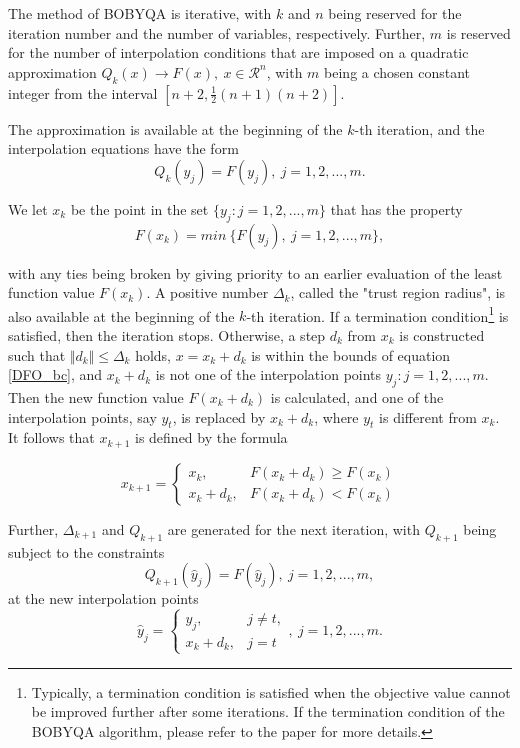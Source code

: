 \documentclass  [
  paper    = a4,
  BCOR     = 10mm,
  twoside,
  fontsize = 12pt,
  fleqn,
  toc      = bibnumbered,
  toc      = listofnumbered,
  numbers  = noendperiod,
  headings = normal,
  listof   = leveldown,
  version  = 3.03
]                                       {scrreprt}
\newcommand{\<}{\langle}
\renewcommand{\>}{\rangle}
\begin{document}
The method of BOBYQA is iterative, with $k$ and $n$ being reserved for the iteration number and the number of variables, respectively. Further, $m$ is reserved for the number of interpolation conditions that are imposed on a quadratic approximation $Q_k(x) \xrightarrow{} F(x), \ x \in  \mathcal{R}^n$, with $m$ being a chosen constant integer from the interval $[n+2, \frac{1}{2}(n+1)(n+2)]$. 

The approximation is available at the beginning of the $k$-th iteration, and the interpolation equations have the form
\begin{equation}
	Q_k(y_j)= F(y_j),\   j = 1, 2, ..., m.
\end{equation}

We let $x_k$ be the point in the set $\{y_j : j = 1, 2, ... , m\}$ that has the property
\begin{equation}
	F(x_k)= min\ \{F(y_j), \  j = 1, 2, ..., m\}, 
\end{equation}

with any ties being broken by giving priority to an earlier evaluation of the least function value $F(x_k)$. A positive number $\Delta_k$, called the "trust region radius", is also available at the beginning of the $k$-th iteration. If a termination condition\footnote{Typically, a termination condition is satisfied when the objective value cannot be improved further after some iterations. If the termination condition of the BOBYQA algorithm, please refer to the paper \cite{MicPow09} for more details.} is satisfied, then the iteration stops. Otherwise, a step $d_k$ from $x_k$ is constructed such that $ \Vert d_k \Vert \leq \Delta_k $ holds, $x = x_k+d_k$ is within the bounds of equation \ref{DFO_bc}, and $x_k+d_k$ is not one of the interpolation points $y_j : j = 1, 2, ... , m$. Then the new function value $F(x_k+d_k)$ is calculated, and one of the interpolation points, say $y_t$, is replaced by $x_k+d_k$, where $y_t$ is different from $x_k$. It follows that $x_{k+1}$ is defined by the formula

\begin{equation}
	x_{k+1} =
	\begin{cases}
		x_k, & F(x_k+d_k) \geq F(x_k) \\
		x_k+d_k  , & F(x_k+d_k) < F(x_k) 
	\end{cases}
\end{equation}

Further, $\Delta_{k+1}$ and $Q_{k+1}$ are generated for the next iteration, with $Q_{k+1}$ being subject to the constraints
\begin{equation}
	Q_{k+1}(\hat{y}_j)= F(\hat{y}_j), \  j = 1, 2, ..., m, 
\end{equation}
at the new interpolation points
\begin{equation}
	\hat{y}_j =
	\begin{cases}
		y_j, & j \neq t, \\
		x_k+d_k  , & j =t 
	\end{cases},  \  j = 1, 2, ..., m.
\end{equation}
\end{document}
